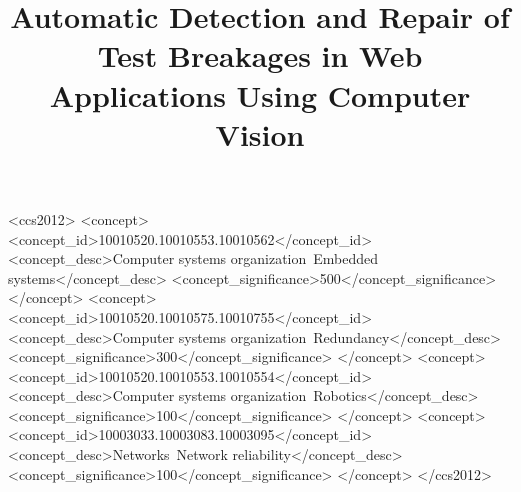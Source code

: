 \documentclass[sigconf,review,anonymous]{acmart}
\begin{document}
\title{Automatic Detection and Repair of Test Breakages in Web Applications Using Computer Vision}


%
%





\begin{abstract}

\end{abstract}

%
%
\begin{CCSXML}
<ccs2012>
 <concept>
  <concept_id>10010520.10010553.10010562</concept_id>
  <concept_desc>Computer systems organization~Embedded systems</concept_desc>
  <concept_significance>500</concept_significance>
 </concept>
 <concept>
  <concept_id>10010520.10010575.10010755</concept_id>
  <concept_desc>Computer systems organization~Redundancy</concept_desc>
  <concept_significance>300</concept_significance>
 </concept>
 <concept>
  <concept_id>10010520.10010553.10010554</concept_id>
  <concept_desc>Computer systems organization~Robotics</concept_desc>
  <concept_significance>100</concept_significance>
 </concept>
 <concept>
  <concept_id>10003033.10003083.10003095</concept_id>
  <concept_desc>Networks~Network reliability</concept_desc>
  <concept_significance>100</concept_significance>
 </concept>
</ccs2012>  
\end{CCSXML}



\keywords{}

\maketitle










\balance
%


\end{document}
